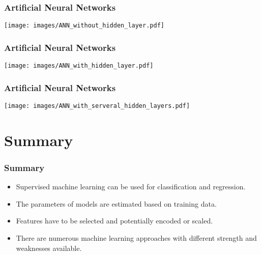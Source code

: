 \documentclass[aspectratio=169]{beamer}
\begin{document}
\begin{frame}
  \frametitle{Artificial Neural Networks}
  \begin{center}    
    \texttt{[image: images/ANN\_without\_hidden\_layer.pdf]}
  \end{center}  
\end{frame}

\begin{frame}
  \frametitle{Artificial Neural Networks}
  \begin{center}
    \texttt{[image: images/ANN\_with\_hidden\_layer.pdf]}
  \end{center}  
\end{frame}

\begin{frame}
  \frametitle{Artificial Neural Networks}
  \begin{center}
    \texttt{[image: images/ANN\_with\_serveral\_hidden\_layers.pdf]}
  \end{center}  
\end{frame}

\section{Summary}

\setcounter{tocdepth}{1}
\begin{frame}{}
   \tableofcontents[currentsubsection]
\end{frame}

\begin{frame}
  \frametitle{Summary}
  \begin{block}{}
    \begin{itemize}
    \item Supervised machine learning can be used for classification and
      regression.
    \item The parameters of models are estimated based on training data.
    \item Features have to be selected and potentially
      encoded or scaled.
    \item There are numerous machine learning approaches with different
      strength and weaknesses available.
    \end{itemize}
  \end{block}    
\end{frame}  
\end{document}
